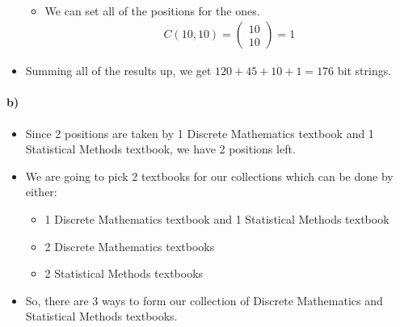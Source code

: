 \documentclass[12pt]{article}
\begin{document}
\begin{itemize}
\begin{itemize}
\begin{equation*}
\begin{split}
   \end{split}
  \end{equation*}
  \item We can set all of the positions for the ones.
  \begin{equation*}
   \begin{split}
   C(10, 10) = \begin{pmatrix} 10 \\ 10 \end{pmatrix} = 1
   \end{split}
  \end{equation*}
 \end{itemize}
 \item Summing all of the results up, we get $120 + 45 + 10 + 1 = 176$ bit strings.
\end{itemize}
\paragraph*{b)}
\begin{itemize}
 \item Since 2 positions are taken by 1 Discrete Mathematics textbook and 1 Statistical Methods textbook, we have 2 positions left.
 \item We are going to pick 2 textbooks for our collections which can be done by either:
 \begin{itemize}
  \item 1 Discrete Mathematics textbook and 1 Statistical Methods textbook
  \item 2 Discrete Mathematics textbooks
  \item 2 Statistical Methods textbooks
 \end{itemize}
 \item So, there are 3 ways to form our collection of Discrete Mathematics and Statistical Methods textbooks.
\end{itemize}
\end{document}
